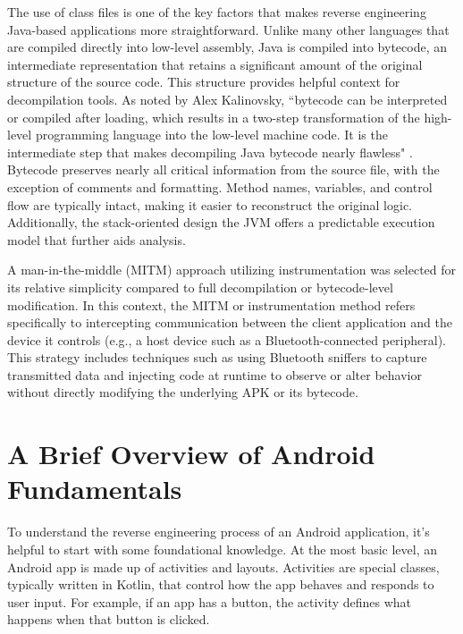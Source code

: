 The use of class files is one of the key factors that makes reverse engineering Java-based applications more straightforward. Unlike many other languages that are compiled directly into low-level assembly, Java is compiled into bytecode, an intermediate representation that retains a significant amount of the original structure of the source code. This structure provides helpful context for decompilation tools.
As noted by Alex Kalinovsky, “bytecode can be interpreted or compiled after loading, which results in a two-step transformation of the high-level programming language into the low-level machine code. It is the intermediate step that makes decompiling Java bytecode nearly flawless" \cite{covertjava}. Bytecode preserves nearly all critical information from the source file, with the exception of comments and formatting. Method names, variables, and control flow are typically intact, making it easier to reconstruct the original logic. Additionally, the stack-oriented design the JVM offers a predictable execution model that further aids analysis.

A man-in-the-middle (MITM) approach utilizing instrumentation was selected for its relative simplicity compared to full decompilation or bytecode-level modification. In this context, the MITM or instrumentation method refers specifically to intercepting communication between the client application and the device it controls (e.g., a host device such as a Bluetooth-connected peripheral). This strategy includes techniques such as using Bluetooth sniffers to capture transmitted data and injecting code at runtime to observe or alter behavior without directly modifying the underlying APK or its bytecode.


\section {A Brief Overview of Android Fundamentals}
To understand the reverse engineering process of an Android application, it’s helpful to start with some foundational knowledge. At the most basic level, an Android app is made up of activities and layouts. Activities are special classes, typically written in Kotlin, that control how the app behaves and responds to user input. For example, if an app has a button, the activity defines what happens when that button is clicked. 

